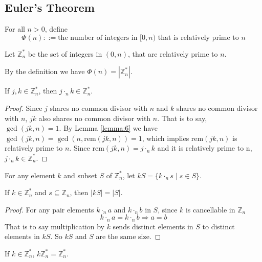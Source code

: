 \documentclass[11pt]{article}
\newcommand{\Zn}{\mathbb{Z}_n}
\newcommand{\Zns}{\mathbb{Z}^\ast_n}
\newcommand{\Dotn}{\cdot_n}
\newcommand{\rem}{\mathrm{rem}}
\begin{document}
\subsection{Euler's Theorem}

\begin{definition}
For all $n > 0$, define
\[
  \Phi(n) ::= \text{the number of integers in } [0, n) \text{ that is relatively prime to }
  n
\]
\end{definition}

\begin{definition}
Let $\Zns$ be the set of integers in $(0,n)$, that are relatively prime to $n$.
\end{definition}

By the definition we have $\Phi(n) = |\Zns|$.

\begin{lemma}
If $j,k \in \Zns$, then $j \cdot_n k \in \Zns$.
\end{lemma}

\begin{proof}
Since $j$ shares no common divisor with $n$ and $k$ shares no common divisor with $n$, $jk$
also shares no common divisor with $n$. That is to say, $\gcd(jk,n)=1$. By Lemma
\ref{lemma:6} we have $\gcd(jk,n) = \gcd(n,\rem(jk,n))=1$, which implies $\rem(jk,n)$ is
relatively prime to $n$. Since $\rem(jk,n) = j \cdot_n k$ and it is relatively prime to n,
$j \cdot_n k \in \Zns$.
\end{proof}

\begin{definition}
For any element $k$ and subset $S$ of $\Zns$, let $kS = \{k \cdot_n s \mid s \in S\}$.
\end{definition}

\begin{lemma} \label{lemma:26}
If $k \in \Zns$ and $s \subseteq \Zn$, then $|kS| = |S|$.
\end{lemma}

\begin{proof}
For any pair elements $k \Dotn a$ and $k \Dotn b$ in $S$, since $k$ is cancellable in $\Zn$
\[
  k \Dotn a = k \Dotn b \Rightarrow a = b
\]
That is to say multiplication by $k$ sends distinct elements in $S$ to distinct elements in
$kS$. So $kS$ and $S$ are the same size.
\end{proof}

\begin{lemma} \label{lemma:28}
If $k \in \Zns$, $k\Zns = \Zns$.
\end{lemma}
\end{document}
